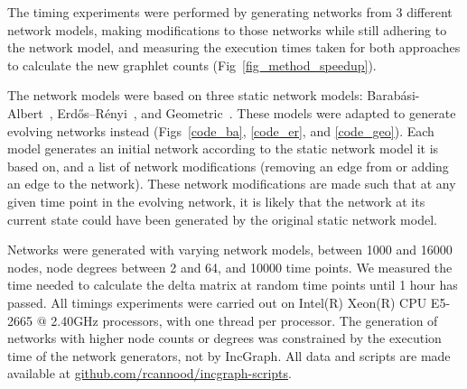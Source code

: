 The timing experiments were performed by generating networks from 3 different network models, making modifications to those networks while still adhering to the network model, and measuring the execution times taken for both approaches to calculate the new graphlet counts (Fig~\ref{fig_method_speedup}). 



The network models were based on three static network models: Barab\'asi-Albert~\cite{albert_statisticalmechanicscomplex_2002}, Erd\H{o}s--R\'enyi~\cite{erdos_randomgraphs_1959}, and Geometric~\cite{appel_minimumvertexdegree_1997}. These models were adapted to generate evolving networks instead (Figs~\ref{code_ba}, \ref{code_er}, and \ref{code_geo}).
Each model generates an initial network according to the static network model it is based on, and a list of network modifications (removing an edge from or adding an edge to the network). These network modifications are made such that at any given time point in the evolving network, it is likely that the network at its current state could have been generated by the original static network model.

Networks were generated with varying network models, between 1000 and 16000 nodes, node degrees between 2 and 64, and 10000 time points. We measured the time needed to calculate the delta matrix at random time points until 1 hour has passed. All timings experiments were carried out on Intel(R) Xeon(R) CPU E5-2665 $@$ 2.40GHz processors, with one thread per processor.
The generation of networks with higher node counts or degrees was constrained by the execution time of the network generators, not by IncGraph. All data and scripts are made available at \href{https://github.com/rcannood/incgraph-scripts}{github.com/rcannood/incgraph-scripts}.

